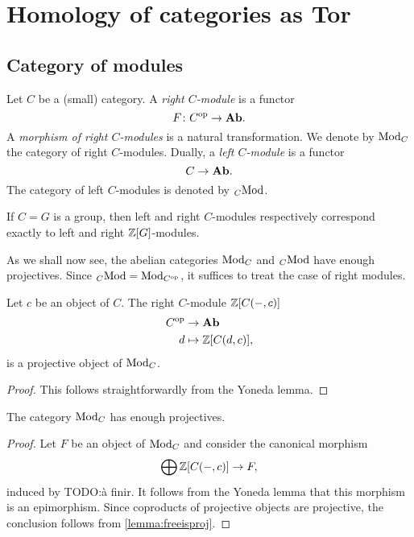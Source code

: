 \section{Homology of categories as Tor}
\subsection{Category of modules}
\begin{definition}
  Let $C$ be a (small) category. A \emph{right $C$\nbd-module} is a
  functor
  \[
    F \colon C^{{\mathrm{op}}} \to \mathbf{Ab}.
  \]
  A \emph{morphism of right $C$\nbd-modules} is a natural
  transformation. We denote by $\mathrm{Mod}_{C}$ the category of right
  $C$\nbd-modules. Dually, a \emph{left $C$\nbd-module} is a functor
  \[
    C \to \mathbf{Ab}.
  \]
  The category of left $C$\nbd-modules is denoted by ${}_{C}\mathrm{Mod}$.
\end{definition}
\begin{example}
  If $C=G$ is a group, then left and right $C$\nbd-modules
  respectively correspond
  exactly to left and right $\mathbb Z[G]$\nbd-modules. 
\end{example}

As we shall now see, the abelian categories $\mathrm{Mod}_{C}$ and ${}_{C}\mathrm{Mod}$
have enough projectives. Since ${}_{C}\mathrm{Mod}=\mathrm{Mod}_{C^{{\mathrm{op}}}}$, it suffices
to treat the case of right modules.

\begin{lemma}\label{lemma:freeisproj}
  Let $c$ be an object of $C$. The right $C$\nbd-module $\mathbb Z[C(-,c)]$
  \[
    \begin{aligned}
      C^{{\mathrm{op}}} &\to \mathbf{Ab}\\
      d &\mapsto \mathbb Z[C(d,c)],
    \end{aligned}
  \]
  is a projective object of $\mathrm{Mod}_{C}$.
\end{lemma}
\begin{proof}
  This follows straightforwardly from the Yoneda lemma.
\end{proof}
\begin{proposition}\label{prop:enoughproj}
  The category $\mathrm{Mod}_{C}$ has enough projectives.
\end{proposition}
\begin{proof}
  Let $F$ be an object of $\mathrm{Mod}_{C}$ and consider the canonical
  morphism
  \[
    \bigoplus \mathbb Z[C(-,c)] \to F,
  \]
  induced by TODO:à finir. It follows from the Yoneda lemma that this morphism is
  an epimorphism. Since coproducts of projective objects
  are projective, the conclusion follows from \cref{lemma:freeisproj}.
\end{proof}
